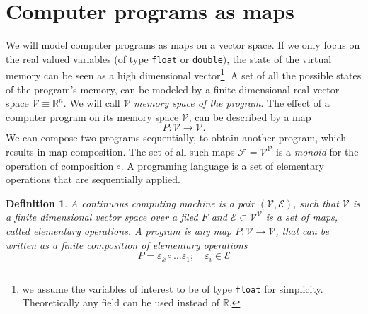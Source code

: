 \documentclass{article}
\newcommand{\RR}{\mathbb{R}}
\newcommand{\E}{\mathcal{E}}
\newcommand{\VV}{\mathcal{V}}
\newcommand{\F}{\mathcal{F}}
\newtheorem{definicija}{Definition}[section]
\begin{document}
\section{Computer programs as maps}
We will model computer programs as maps on a vector space. If
we only focus on the real valued variables (of type \texttt{float} or
\texttt{double}),  the state of the virtual memory can be seen as a high
dimensional vector\footnote{we assume the variables of interest to be of type \texttt{float} for
  simplicity. Theoretically any field can be used instead of $\RR$.}. 
A set of all the possible states of the program's memory,
can be modeled by a finite dimensional real vector space $\VV\equiv \RR^n$. We
will call $\VV$ \emph{memory space of the program}. The effect of a computer
program on its memory space $\VV$, can be described by a map
\begin{equation}
  \label{eq:map}
  P:\VV\to \VV.
\end{equation}
We can compose two programs sequentially, to obtain another program, which
results in map composition. The set of all such maps $\F=\VV^\VV$ is a
\emph{monoid} for the operation of composition $\circ$. A programing language is
a set of elementary operations that are sequentially applied. 
\begin{definicija} A \emph{continuous computing machine} is a pair $(\VV,\E)$, such
  that $\VV$ is a finite dimensional vector space over a filed $F$ and
  $\E\subset \VV^\VV$ is a set of maps, called \emph{elementary operations}. A
  \emph{program} is any map $P:\VV\to \VV$, that can be written as a finite  composition
  of elementary operations
  \begin{equation}
    \label{eq:P_composition}
    P=\varepsilon_k\circ\ldots \varepsilon_1;\quad \varepsilon_i\in \E
  \end{equation}
  
\end{definicija}
\end{document}
